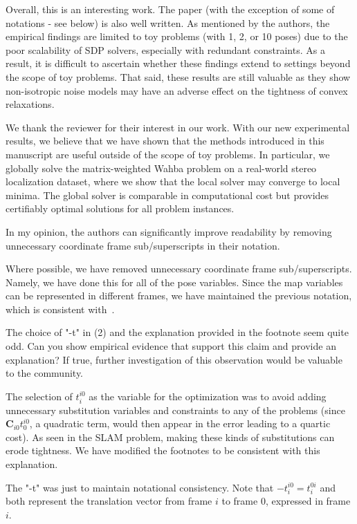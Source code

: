Overall, this is an interesting work. The paper (with the exception of some of notations - see below) is also well written. As mentioned by the authors, the empirical findings are limited to toy problems (with 1, 2, or 10 poses) due to the poor scalability of SDP solvers, especially with redundant constraints. As a result, it is difficult to ascertain whether these findings extend to settings beyond the scope of toy problems. That said, these results are still valuable as they show non-isotropic noise models may have an adverse effect on the tightness of convex relaxations.
\begin{response}

We thank the reviewer for their interest in our work. With our new experimental results, we believe that we have shown that the methods introduced in this manuscript are useful outside of the scope of toy problems. In particular, we globally solve the matrix-weighted Wahba problem on a real-world stereo localization dataset, where we show that the local solver may converge to local minima. The global solver is comparable in computational cost but provides certifiably optimal solutions for all problem instances.

\end{response}
In my opinion, the authors can significantly improve readability by removing unnecessary coordinate frame sub/superscripts in their notation. 
\begin{response}

Where possible, we have removed unnecessary coordinate frame sub/superscripts. Namely, we have done this for all of the pose variables. Since the map variables can be represented in different frames, we have maintained the previous notation, which is consistent with~\cite{barfoot2011state}. 

\end{response}
The choice of "-t" in (2) and the explanation provided in the footnote seem quite odd.  Can you show empirical evidence that support this claim and provide an explanation? If true, further investigation of this observation would be valuable to the community.
\begin{response}

The selection of $t_i^{i0}$ as the variable for the optimization was to avoid adding unnecessary substitution variables and constraints to any of the problems (since $\bm{C}_{i0}t_0^{i0} $, a quadratic term, would then appear in the error leading to a quartic cost). As seen in the SLAM problem, making these kinds of substitutions can erode tightness. We have modified the footnotes to be consistent with this explanation.

The "-t" was just to maintain notational consistency. Note that $-t_i^{i0} = t_i^{0i}$ and both represent the translation vector from frame $i$ to frame $0$, expressed in frame $i$.

\end{response}
